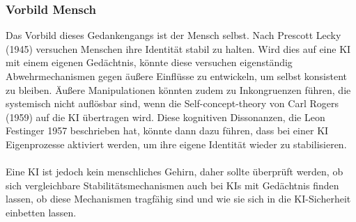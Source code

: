 \subsubsection*{Vorbild Mensch}
Das Vorbild dieses Gedankengangs ist der Mensch selbst. Nach Prescott Lecky (1945) versuchen Menschen ihre Identität stabil zu halten. Wird dies auf eine KI mit einem eigenen Gedächtnis, könnte diese versuchen eigenständig Abwehrmechanismen gegen äußere Einflüsse zu entwickeln, um selbst konsistent zu bleiben. Äußere Manipulationen könnten zudem zu Inkongruenzen führen, die systemisch nicht auflösbar sind, wenn die Self-concept-theory von Carl Rogers (1959) auf die KI übertragen wird. Diese kognitiven Dissonanzen, die Leon Festinger 1957 beschrieben hat, könnte dann dazu führen, dass bei einer KI Eigenprozesse aktiviert werden, um ihre eigene Identität wieder zu stabilisieren.\\
\\
Eine KI ist jedoch kein menschliches Gehirn, daher sollte überprüft werden, ob sich vergleichbare Stabilitätsmechanismen auch bei KIs mit Gedächtnis finden lassen, ob diese Mechanismen tragfähig sind und wie sie sich in die KI-Sicherheit einbetten lassen.


